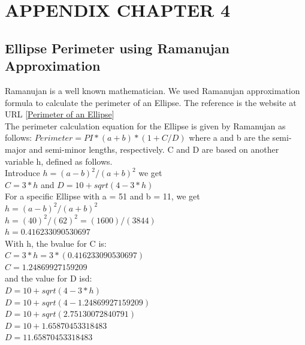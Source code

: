 \section{APPENDIX CHAPTER 4}\label{APPENDIX CHAPTER 4}


\subsection{Ellipse Perimeter using Ramanujan Approximation}
\label{app-chap4-Ellipse Perimeter using Ramanujan Approximation}

\noindent
Ramanujan is a well known mathematician. We used Ramanujan approximation formula to calculate the perimeter of an Ellipse. The reference is the website at URL [\href{https://www.mathsisfun.com/geometry/ellipse-perimeter.html}{Perimeter of an Ellipse}]\\

\noindent
The perimeter calculation equation for the Ellipse is given by Ramanujan as follows: 
\noindent
$Perimeter = PI*(a + b)*(1 + C/D) $ where a and b are the semi-major and semi-minor lengths, respectively. C and D are based on another variable h, defined as follows.\\

\singlespacing
\noindent
Introduce $h = (a - b)^{2} / (a + b)^{2}$ we get \\
$C = 3*h $ and $D = 10 + sqrt(4 - 3*h) $ \\

\singlespacing
\noindent
For a specific Ellipse with a = 51 and b = 11, we get\\
$h = (a - b)^{2} / (a + b)^{2}$ \\
$h = (40)^{2}/(62)^{2} = (1600)/(3844) $ \\
$h = 0.416233090530697 $\\

\singlespacing
\noindent
With h, the bvalue for C is:\\
$C = 3*h = 3*(0.416233090530697) $\\
$C = 1.24869927159209 $\\

\singlespacing
\noindent
and the value for D isd: \\
$D = 10 + sqrt(4 - 3*h) $ \\
$D = 10 + sqrt(4 - 1.24869927159209) $ \\
$D = 10 + sqrt(2.75130072840791) $\\
$D = 10 + 1.65870453318483 $ \\
$D = 11.65870453318483 $ \\


